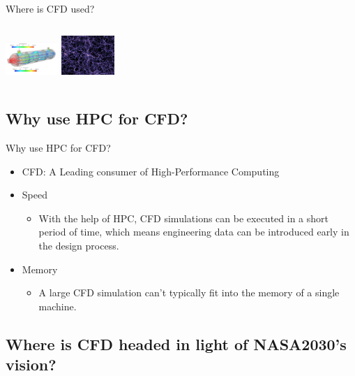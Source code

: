 \documentclass[10pt]{beamer}
\begin{document}
\begin{frame}{Where is CFD used?}
\begin{columns}
\begin{column}{0.7\textwidth}
\includegraphics[height=0.15\columnwidth,width=2.0cm]{./figs/app11.jpg}
\includegraphics[height=0.15\columnwidth,width=2.0cm]{./figs/app12.jpg}\\
\end{column}
\end{columns}

\end{frame}


\subsection{Why use HPC for CFD?}

\begin{frame}{Why use HPC for CFD?}
\begin{itemize}
\justifying
\item[\ding{113}] CFD: A Leading consumer of High-Performance Computing

\item[\ding{113}] Speed
\begin{itemize}
\justifying
\item[\ding{252}] With the help of HPC, CFD simulations can be executed in a short period of time, which means engineering data can be introduced early in the design process.
\end{itemize}
\it
\item[\ding{113}] Memory
\begin{itemize}
\justifying
\item[\ding{252}] A large CFD simulation can’t typically fit into the memory of a single machine.
\end{itemize}
\end{itemize}
\end{frame}


\subsection{Where is CFD headed in light of NASA2030's vision?}
\end{document}
